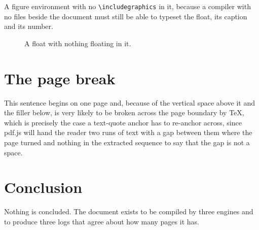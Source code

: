 \documentclass[11pt]{article}
\begin{document}
A figure environment with no \verb|\includegraphics| in it, because a
compiler with no files beside the document must still be able to typeset the
float, its caption and its number.

\begin{figure}[h]
  \centering
  \caption{A float with nothing floating in it.}
  \label{fig:empty}
\end{figure}

\section{The page break}

\vspace{12em}

This sentence begins on one page and, because of the vertical space above it
and the filler below, is very likely to be broken across the page boundary by
\TeX{}, which is precisely the case a text-quote anchor has to re-anchor
across, since pdf.js will hand the reader two runs of text with a gap between
them where the page turned and nothing in the extracted sequence to say that
the gap is not a space.

\vspace{6em}

\section{Conclusion}

Nothing is concluded. The document exists to be compiled by three engines and
to produce three logs that agree about how many pages it has.



\end{document}
